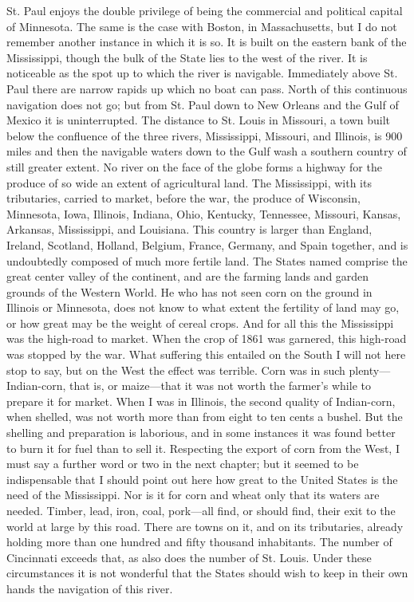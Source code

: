 St. Paul enjoys the double privilege of being the commercial and
political capital of Minnesota.  The same is the case with Boston,
in Massachusetts, but I do not remember another instance in which
it is so.  It is built on the eastern bank of the Mississippi,
though the bulk of the State lies to the west of the river.  It is
noticeable as the spot up to which the river is navigable.
Immediately above St. Paul there are narrow rapids up which no boat
can pass.  North of this continuous navigation does not go; but
from St. Paul down to New Orleans and the Gulf of Mexico it is
uninterrupted.  The distance to St. Louis in Missouri, a town built
below the confluence of the three rivers, Mississippi, Missouri,
and Illinois, is 900 miles and then the navigable waters down to
the Gulf wash a southern country of still greater extent.  No river
on the face of the globe forms a highway for the produce of so wide
an extent of agricultural land.  The Mississippi, with its
tributaries, carried to market, before the war, the produce of
Wisconsin, Minnesota, Iowa, Illinois, Indiana, Ohio, Kentucky,
Tennessee, Missouri, Kansas, Arkansas, Mississippi, and Louisiana.
This country is larger than England, Ireland, Scotland, Holland,
Belgium, France, Germany, and Spain together, and is undoubtedly
composed of much more fertile land.  The States named comprise the
great center valley of the continent, and are the farming lands and
garden grounds of the Western World.  He who has not seen corn on
the ground in Illinois or Minnesota, does not know to what extent
the fertility of land may go, or how great may be the weight of
cereal crops.  And for all this the Mississippi was the high-road
to market.  When the crop of 1861 was garnered, this high-road was
stopped by the war.  What suffering this entailed on the South I
will not here stop to say, but on the West the effect was terrible.
Corn was in such plenty---Indian-corn, that is, or maize---that it
was not worth the farmer's while to prepare it for market.  When I
was in Illinois, the second quality of Indian-corn, when shelled,
was not worth more than from eight to ten cents a bushel.  But the
shelling and preparation is laborious, and in some instances it was
found better to burn it for fuel than to sell it.  Respecting the
export of corn from the West, I must say a further word or two in
the next chapter; but it seemed to be indispensable that I should
point out here how great to the United States is the need of the
Mississippi.  Nor is it for corn and wheat only that its waters are
needed.  Timber, lead, iron, coal, pork---all find, or should find,
their exit to the world at large by this road.  There are towns on
it, and on its tributaries, already holding more than one hundred
and fifty thousand inhabitants.  The number of Cincinnati exceeds
that, as also does the number of St. Louis.  Under these
circumstances it is not wonderful that the States should wish to
keep in their own hands the navigation of this river.

